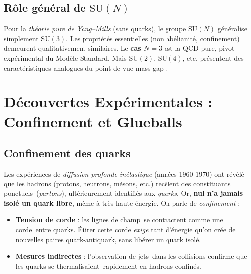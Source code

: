 \subsection*{Rôle général de \(\mathrm{SU}(N)\)}
Pour la \emph{théorie pure de Yang--Mills} (sans quarks), le groupe \(\mathrm{SU}(N)\) généralise simplement \(\mathrm{SU}(3)\). Les propriétés essentielles (non abélianité, confinement) demeurent qualitativement similaires. Le \textbf{cas \(N=3\)} est la QCD pure, pivot expérimental du Modèle Standard. Mais \(\mathrm{SU}(2)\), \(\mathrm{SU}(4)\), etc. présentent des caractéristiques analogues du point de vue mass gap \cite{ItzyksonDrouffe1989}.

\vspace{1em}

\section{Découvertes Expérimentales : Confinement et Glueballs}
\label{sec:2.2}

\subsection*{Confinement des quarks}
Les expériences de \emph{diffusion profonde inélastique} (années 1960-1970) ont révélé que les hadrons (protons, neutrons, mésons, etc.) recèlent des constituants \og ponctuels\fg\ (\textit{partons}), ultérieurement identifiés aux \emph{quarks}. Or, \textbf{nul n'a jamais isolé un quark libre}, même à très haute énergie. On parle de \emph{confinement} :
\begin{itemize}
	\item \textbf{Tension de corde} : les \og lignes de champ\fg\ se contractent comme une \og corde\fg\ entre quarks. Étirer cette corde \emph{exige} tant d'énergie qu'on crée de nouvelles paires quark-antiquark, sans libérer un quark isolé.
	\item \textbf{Mesures indirectes} : l'observation de \og jets\fg\ dans les collisions confirme que les quarks se \og thermalisaient\fg\ rapidement en hadrons confinés.
\end{itemize}

